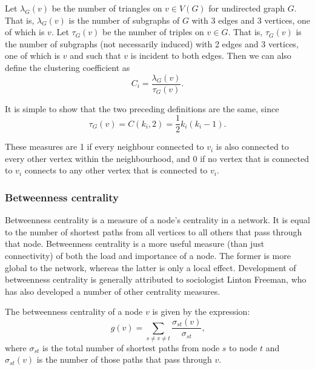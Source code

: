         Let $\lambda_G(v)$ be the number of triangles on $v \in V(G)$ for undirected graph $G$. That is, $\lambda_G(v)$ is the number of subgraphs of $G$ with 3 edges and 3 vertices, one of which is $v$. Let $\tau_G(v)$ be the number of triples on $v \in G$. That is, $\tau_G(v)$ is the number of subgraphs (not necessarily induced) with 2 edges and 3 vertices, one of which is $v$ and such that $v$ is incident to both edges. Then we can also define the clustering coefficient as
        \begin{equation}
          C_i = \frac{\lambda_G(v)}{\tau_G(v)} \mbox{.}
        \end{equation}

        It is simple to show that the two preceding definitions are the same, since
        \begin{equation}
          \tau_G(v) = C({k_i},2) = \frac{1}{2}k_i(k_i-1) \mbox{.}
        \end{equation}

        These measures are 1 if every neighbour connected to $v_i$ is also connected to every other vertex within the neighbourhood, and 0 if no vertex that is connected to $v_i$ connects to any other vertex that is connected to $v_i$.

    \subsubsection{Betweenness centrality}
        
      Betweenness centrality is a measure of a node's centrality in a network. It is equal to the number of shortest paths from all vertices to all others that pass through that node. Betweenness centrality is a more useful measure (than just connectivity) of both the load and importance of a node. The former is more global to the network, whereas the latter is only a local effect. Development of betweenness centrality is generally attributed to sociologist Linton Freeman, who has also developed a number of other centrality measures\cite{Freeman1977}.
          
      The betweenness centrality of a node $v$ is given by the expression:
      \begin{equation}
        g(v) = \sum_{s \neq v \neq t} \frac{\sigma_{st}(v)}{\sigma_{st}} \mbox{,}
      \end{equation}
      where $\sigma_{st}$ is the total number of shortest paths from node $s$ to node $t$ and $\sigma_{st}(v)$ is the number of those paths that pass through $v$.
          
